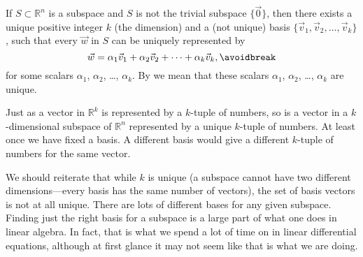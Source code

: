 \begin{theorem}
\pagebreak[2]
If $S \subset {\mathbb R}^n$ is a subspace and $S$ is not the trivial
subspace $\{ \vec{0} \}$, then there exists a
unique positive integer $k$ (the dimension) and a (not unique)
basis
$\{ \vec{v}_1, \vec{v}_2, \ldots, \vec{v}_k \}$, such that every
$\vec{w}$ in $S$ can be uniquely represented by
\begin{equation*}
\vec{w} = 
\alpha_1 \vec{v}_1 + 
\alpha_2 \vec{v}_2 + 
\cdots
+
\alpha_k \vec{v}_k ,
\avoidbreak
\end{equation*}
for some scalars $\alpha_1$, $\alpha_2$, \ldots, $\alpha_k$.
By  we mean that these
scalars $\alpha_1$, $\alpha_2$, \ldots, $\alpha_k$ are unique.
\end{theorem}

Just as a vector in ${\mathbb R}^k$ is represented by a $k$-tuple of
numbers, so is a vector in a $k$-dimensional subspace of ${\mathbb R}^n$
represented by a unique $k$-tuple of numbers.  At least once we have fixed a basis.
A different basis would give a different $k$-tuple of numbers for the same
vector.

We should reiterate that while $k$ is unique
(a subspace cannot have two different dimensions---every
basis has the same number of vectors),
the set of basis vectors is not at all unique.  There are lots
of different bases for any given subspace.  Finding just the right basis for
a subspace is a large part of what one does in linear algebra.  In fact,
that is what we spend a lot of time on in
linear differential equations, although at first glance
it may not seem like that is what we are doing.

